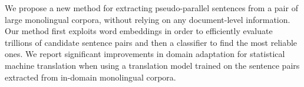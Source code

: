 We propose a new method for extracting pseudo-parallel sentences from a pair of large monolingual corpora, without relying on any document-level information. Our method first exploits word embeddings in order to efficiently evaluate trillions of candidate sentence pairs and then a classifier to find the most reliable ones. We report significant improvements in domain adaptation for statistical machine translation when using a translation model trained on the sentence pairs extracted from in-domain monolingual corpora.

